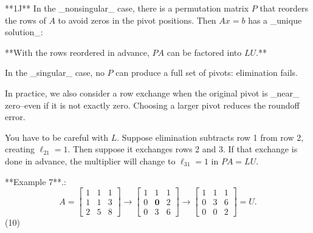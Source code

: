 **1J** In the _nonsingular_ case, there is a permutation matrix \(P\) that reorders the rows of \(A\) to avoid zeros in the pivot positions. Then \(Ax=b\) has a _unique solution_:

**With the rows reordered in advance, \(PA\) can be factored into \(LU\).**

In the _singular_ case, no \(P\) can produce a full set of pivots: elimination fails.

In practice, we also consider a row exchange when the original pivot is _near_ zero--even if it is not exactly zero. Choosing a larger pivot reduces the roundoff error.

You have to be careful with \(L\). Suppose elimination subtracts row 1 from row 2, creating \(\ell_{21}=1\). Then suppose it exchanges rows 2 and 3. If that exchange is done in advance, the multiplier will change to \(\ell_{31}=1\) in \(PA=LU\).

**Example 7**.: \[A=\begin{bmatrix}1&1&1\\ 1&1&3\\ 2&5&8\end{bmatrix}\rightarrow\begin{bmatrix}1&1&1\\ 0&\mathbf{0}&2\\ 0&3&6\end{bmatrix}\rightarrow\begin{bmatrix}1&1&1\\ 0&3&6\\ 0&0&2\end{bmatrix}=U.\] (10) 